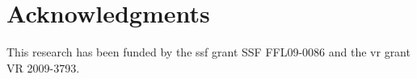 


\section*{Acknowledgments}
    \label{section:document-submission-system:acknowledgments}
This research has been funded by the \Acl{ssf} grant SSF FFL09-0086 and the \Acl{vr} 
grant VR 2009-3793.



% 
% 


% 